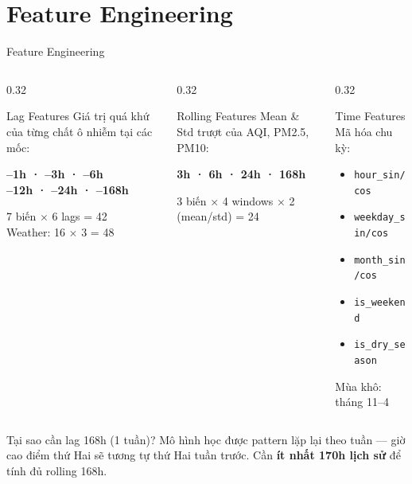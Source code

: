 \documentclass[aspectratio=169]{beamer}
\begin{document}
\section{Feature Engineering}

\begin{frame}{Feature Engineering}
  \begin{columns}[T]
    \begin{column}{0.32\textwidth}
      \begin{block}{Lag Features}
        Giá trị quá khứ của từng chất ô nhiễm tại các mốc:
        \vspace{0.3em}
        \begin{center}
          \textbf{--1h · --3h · --6h}\\
          \textbf{--12h · --24h · --168h}
        \end{center}
        \vspace{0.3em}
        \small 7 biến $\times$ 6 lags = 42\\
        Weather: 16 $\times$ 3 = 48
      \end{block}
    \end{column}
    \begin{column}{0.32\textwidth}
      \begin{block}{Rolling Features}
        Mean \& Std trượt của AQI, PM2.5, PM10:
        \vspace{0.3em}
        \begin{center}
          \textbf{3h · 6h · 24h · 168h}
        \end{center}
        \vspace{0.3em}
        \small 3 biến $\times$ 4 windows $\times$ 2 (mean/std) = 24
      \end{block}
    \end{column}
    \begin{column}{0.32\textwidth}
      \begin{block}{Time Features}
        Mã hóa chu kỳ:
        \begin{itemize}\small
          \item \texttt{hour\_sin/cos}
          \item \texttt{weekday\_sin/cos}
          \item \texttt{month\_sin/cos}
          \item \texttt{is\_weekend}
          \item \texttt{is\_dry\_season}
        \end{itemize}
        \small Mùa khô: tháng 11--4
      \end{block}
    \end{column}
  \end{columns}
  \vspace{0.5em}
  \begin{alertblock}{Tại sao cần lag 168h (1 tuần)?}
    Mô hình học được pattern lặp lại theo tuần --- giờ cao điểm thứ Hai sẽ tương tự thứ Hai tuần trước.
    Cần \textbf{ít nhất 170h lịch sử} để tính đủ rolling 168h.
  \end{alertblock}
\end{frame}
\end{document}

